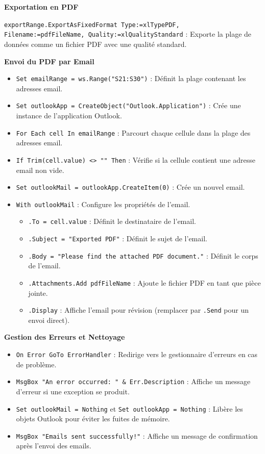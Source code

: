 \documentclass[a4paper, oneside, 12pt, final]{extreport}
\begin{document}
\textbf{Exportation en PDF}

\texttt{exportRange.ExportAsFixedFormat Type:=xlTypePDF, Filename:=pdfFileName, Quality:=xlQualityStandard} : Exporte la plage de données comme un fichier PDF avec une qualité standard.

\textbf{Envoi du PDF par Email}

\begin{itemize}
    \item \texttt{Set emailRange = ws.Range("S21:S30")} : Définit la plage contenant les adresses email.
    \item \texttt{Set outlookApp = CreateObject("Outlook.Application")} : Crée une instance de l'application Outlook.
    \item \texttt{For Each cell In emailRange} : Parcourt chaque cellule dans la plage des adresses email.
    \item \texttt{If Trim(cell.value) <> "" Then} : Vérifie si la cellule contient une adresse email non vide.
    \item \texttt{Set outlookMail = outlookApp.CreateItem(0)} : Crée un nouvel email.
    \item \texttt{With outlookMail} : Configure les propriétés de l'email.
    \begin{itemize}
        \item \texttt{.To = cell.value} : Définit le destinataire de l'email.
        \item \texttt{.Subject = "Exported PDF"} : Définit le sujet de l'email.
        \item \texttt{.Body = "Please find the attached PDF document."} : Définit le corps de l'email.
        \item \texttt{.Attachments.Add pdfFileName} : Ajoute le fichier PDF en tant que pièce jointe.
        \item \texttt{.Display} : Affiche l'email pour révision (remplacer par \texttt{.Send} pour un envoi direct).
    \end{itemize}
\end{itemize}

\textbf{Gestion des Erreurs et Nettoyage}

\begin{itemize}
    \item \texttt{On Error GoTo ErrorHandler} : Redirige vers le gestionnaire d'erreurs en cas de problème.
    \item \texttt{MsgBox "An error occurred: " \& Err.Description} : Affiche un message d'erreur si une exception se produit.
    \item \texttt{Set outlookMail = Nothing} et \texttt{Set outlookApp = Nothing} : Libère les objets Outlook pour éviter les fuites de mémoire.
    \item \texttt{MsgBox "Emails sent successfully!"} : Affiche un message de confirmation après l'envoi des emails.
\end{itemize}
\end{document}
